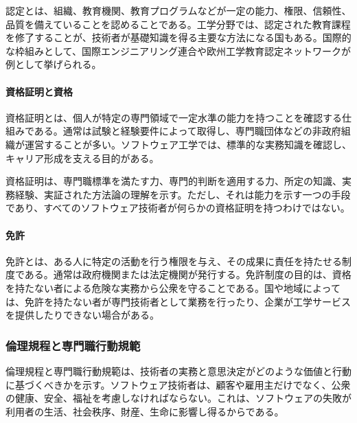 \documentclass[a4paper,11pt]{ltjsarticle}
\numberwithin{figure}{section}
\numberwithin{table}{section}
\begin{document}

認定とは、組織、教育機関、教育プログラムなどが一定の能力、権限、信頼性、品質を備えていることを認めることである。工学分野では、認定された教育課程を修了することが、技術者が基礎知識を得る主要な方法になる国もある。国際的な枠組みとして、国際エンジニアリング連合や欧州工学教育認定ネットワークが例として挙げられる。

\paragraph*{資格証明と資格}


資格証明とは、個人が特定の専門領域で一定水準の能力を持つことを確認する仕組みである。通常は試験と経験要件によって取得し、専門職団体などの非政府組織が運営することが多い。ソフトウェア工学では、標準的な実務知識を確認し、キャリア形成を支える目的がある。

資格証明は、専門職標準を満たす力、専門的判断を適用する力、所定の知識、実務経験、実証された方法論の理解を示す。ただし、それは能力を示す一つの手段であり、すべてのソフトウェア技術者が何らかの資格証明を持つわけではない。

\paragraph*{免許}


免許とは、ある人に特定の活動を行う権限を与え、その成果に責任を持たせる制度である。通常は政府機関または法定機関が発行する。免許制度の目的は、資格を持たない者による危険な実務から公衆を守ることである。国や地域によっては、免許を持たない者が専門技術者として業務を行ったり、企業が工学サービスを提供したりできない場合がある。

\subsubsection*{倫理規程と専門職行動規範}


倫理規程と専門職行動規範は、技術者の実務と意思決定がどのような価値と行動に基づくべきかを示す。ソフトウェア技術者は、顧客や雇用主だけでなく、公衆の健康、安全、福祉を考慮しなければならない。これは、ソフトウェアの失敗が利用者の生活、社会秩序、財産、生命に影響し得るからである。
\end{document}
